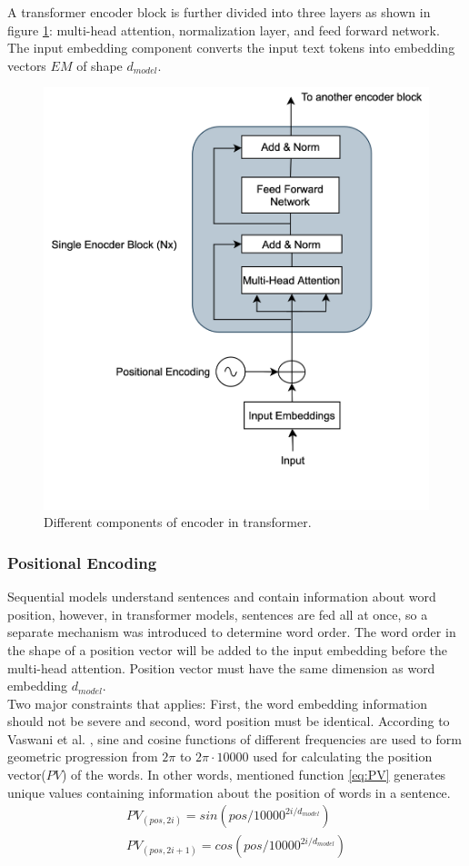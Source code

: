 \documentclass[%
	BCOR=8mm, %
	DIV=12,
	toc=bibliography, %
	toc=listof, %
	oneside, %
	egregdoesnotlikesansseriftitles, %
	]{scrbook}
\begin{document}
A transformer encoder block is further divided into three layers as shown in figure \ref{diag:EncoderArch}: multi-head attention, normalization layer, and feed forward network. The input embedding component converts the input text tokens into embedding vectors $EM$ of shape $d_{model}$.
\begin{figure}[H]
\centering
\includegraphics[width=.50\textwidth]{img/EncoderArch.png}
\caption[Different components of encoder in transformer]{Different components of encoder in transformer.}
\label{diag:EncoderArch}
\end{figure}
\subsubsection{Positional Encoding}
Sequential models understand sentences and contain information about word position, however, in transformer models, sentences are fed all at once, so a separate mechanism was introduced to determine word order. The word order in the shape of a position vector will be added to the input embedding before the multi-head attention. Position vector must have the same dimension as word embedding $d_{model}$.\\
Two major constraints that applies: First, the word embedding information should not be severe and second, word position must be identical. According to Vaswani et al. \cite{vaswani_attention_2017}, sine and cosine functions of different frequencies are used to form geometric progression from  $2\pi$ to $2\pi \cdot 10000$ used for calculating the position vector($PV$) of the words. In other words, mentioned function \ref{eq:PV} generates unique values containing information about the position of words in a sentence.
\begin{equation}
\begin{aligned}
    PV_{(pos,2i)}=sin(pos/10000^{2i/d_{model}})\\
    PV_{(pos,2i+1)}=cos(pos/10000^{2i/d_{model}})
    \label{eq:PV}
\end{aligned}
\end{equation}
\end{document}
